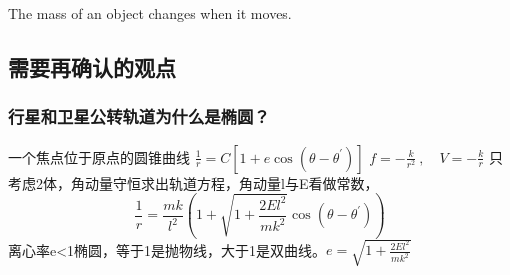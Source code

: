 The mass of an object changes when it moves.

\subsection{需要再确认的观点}
\subsubsection{行星和卫星公转轨道为什么是椭圆？}

一个焦点位于原点的圆锥曲线
$\frac{1}{r}=C\left[1+e\cos(\theta-\theta^{\prime})\right]$
$f=-\frac{k}{r^{2}}~,\quad V=-\frac{k}{r}$
只考虑2体，角动量守恒求出轨道方程，角动量l与E看做常数，
$$\frac{1}{r}=\frac{mk}{l^{2}}\left(1+\sqrt{1+\frac{2El^{2}}{mk^{2}}}\cos(\theta-\theta^{\prime})\right)$$
离心率e<1椭圆，等于1是抛物线，大于1是双曲线。$e=\sqrt{1+\frac{2El^{2}}{mk^{2}}}$
